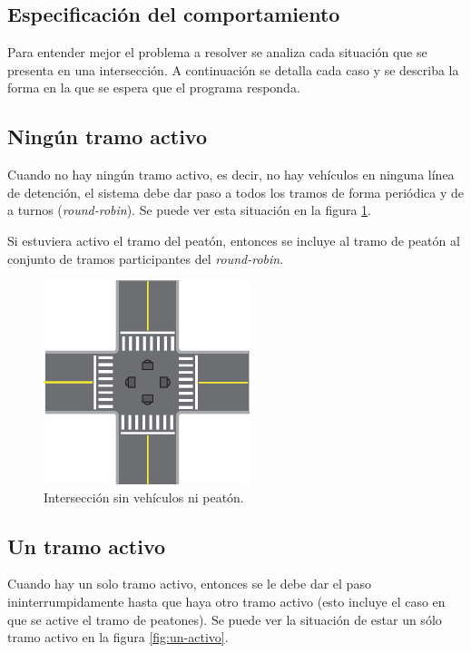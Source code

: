 	\subsection{Especificación del comportamiento}\label{sec:spec}

		Para entender mejor el problema a resolver se analiza cada situación que se presenta en una intersección.
		A continuación se detalla cada caso y se describa la forma en la que se espera que el programa responda.



	\subsection{Ningún tramo activo}

		Cuando no hay ningún tramo activo, es decir, no hay vehículos en ninguna línea de detención, el sistema debe dar paso a todos los tramos de forma periódica y de a turnos (\emph{round-robin}).
		Se puede ver esta situación en la figura \ref{fig:ningun-activo}.

		Si estuviera activo el tramo del peatón, entonces se incluye al tramo de peatón al conjunto de tramos participantes del \emph{round-robin}.

		\begin{figure}[htbp]
			\centering
			\includegraphics[width=6cm]{imagenes/ningun-activo.eps}
			\caption{Intersección sin vehículos ni peatón.}
			\label{fig:ningun-activo}
		\end{figure}



	\subsection{Un tramo activo}

		Cuando hay un solo tramo activo, entonces se le debe dar el paso ininterrumpidamente hasta que haya otro tramo activo (esto incluye el caso en que se active el tramo de peatones).
		Se puede ver la situación de estar un sólo tramo activo en la figura \ref{fig:un-activo}.

